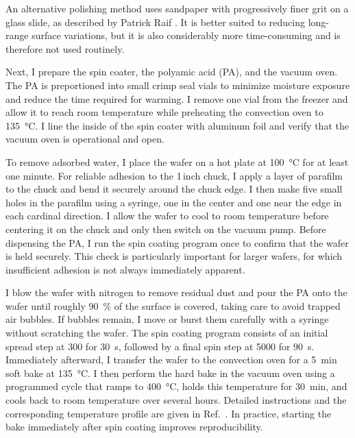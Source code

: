         An alternative polishing method uses sandpaper with progressively finer grit on a glass slide, as described by Patrick Raif \cite{raif_fabrication_2023}. It is better suited to reducing long-range surface variations, but it is also considerably more time-consuming and is therefore not used routinely.

        Next, I prepare the spin coater, the polyamic acid (PA), and the vacuum oven. The PA is preportioned into small crimp seal vials to minimize moisture exposure and reduce the time required for warming. I remove one vial from the freezer and allow it to reach room temperature while preheating the convection oven to \qty{135}{\degreeCelsius}. I line the inside of the spin coater with aluminum foil and verify that the vacuum oven is operational and open.

        To remove adsorbed water, I place the wafer on a hot plate at \qty{100}{\degreeCelsius} for at least one minute. For reliable adhesion to the 1\,inch chuck, I apply a layer of parafilm to the chuck and bend it securely around the chuck edge. I then make five small holes in the parafilm using a syringe, one in the center and one near the edge in each cardinal direction. I allow the wafer to cool to room temperature before centering it on the chuck and only then switch on the vacuum pump. Before dispensing the PA, I run the spin coating program once to confirm that the wafer is held securely. This check is particularly important for larger wafers, for which insufficient adhesion is not always immediately apparent.
        
        I blow the wafer with nitrogen to remove residual dust and pour the PA onto the wafer until roughly \qty{90}{\percent} of the surface is covered, taking care to avoid trapped air bubbles. If bubbles remain, I move or burst them carefully with a syringe without scratching the wafer. The spin coating program consists of an initial spread step at \qty{300}{\rpm} for \qty{30}{\second}, followed by a final spin step at \qty{5000}{\rpm} for \qty{90}{\second}. Immediately afterward, I transfer the wafer to the convection oven for a \qty{5}{\minute} soft bake at \qty{135}{\degreeCelsius}. I then perform the hard bake in the vacuum oven using a programmed cycle that ramps to \qty{400}{\degreeCelsius}, holds this temperature for \qty{30}{\minute}, and cools back to room temperature over several hours. Detailed instructions and the corresponding temperature profile are given in Ref.~\cite{raif_fabrication_2023}. In practice, starting the bake immediately after spin coating improves reproducibility.
        
